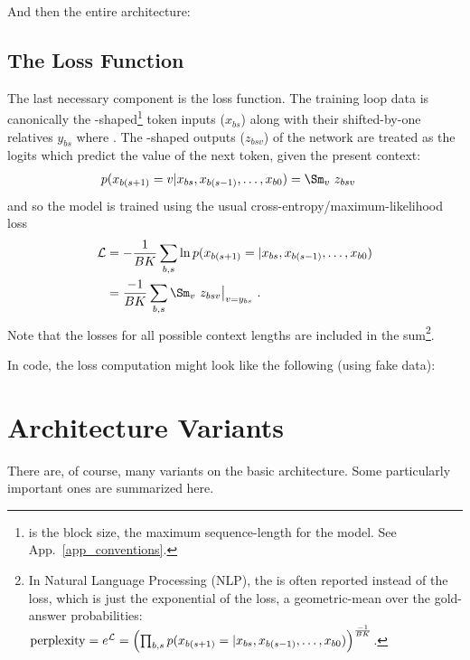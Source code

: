 \documentclass[11pt]{article}
\begin{document}
And then the entire architecture: 


\subsection{The Loss Function}

The last necessary component is the loss function. The training loop data is canonically the
-shaped\footnote{ is the block size, the maximum sequence-length for
the model. See App.~\ref{app_conventions}.}  token inputs ($ x _{ bs } $) along with their shifted-by-one relatives $ y
_{ bs }$ where .  The -shaped
outputs ($ z _{ bsv } $)  of the  network are treated as the logits which
predict the value of the next token, given the present context:
\begin{align}
    p(x _{ b (s+1) }=v| x _{ b s }, x _{ b (s-1) }, \ldots, x _{ b 0 }) &= \Sm _{ v }\ z _{ bsv
    }\label{eq_transformer_conditional_prob}
\end{align}
and so the model is trained using the usual cross-entropy/maximum-likelihood loss
\begin{align}
  \Lcal &= -\frac{ 1 }{ BK }\sum _{ b,s }\ln p(x _{ b (s+1) }=| x _{ b s }, x _{ b (s-1) },
  \ldots, x _{ b 0 })\nn
  &= \frac{- 1 }{ BK }\sum _{ b,s }\Sm _{ v }\ z _{ bsv}\big| _{ v=y _{ bs } } \ .
\end{align}
Note that the losses for all possible context lengths are included in the sum\footnote{In Natural Language Processing (NLP),
the  is often reported instead of the loss, which is just the exponential of the loss, a geometric-mean over the
gold-answer probabilities: $ {\rm perplexity} = e^{ \mathcal{L} } =\left (\prod _{ b, s }p(x _{ b (s+1) }=| x _{ b s }, x _{ b (s-1) },
  \ldots, x _{ b 0 })\right ) ^{ \frac{ -1 }{ BK } }$.}.

In 
code, the loss computation might look like the following (using fake data):


\section{Architecture Variants}

There are, of course, many variants on the basic architecture. Some particularly important ones are
summarized here.
\end{document}
